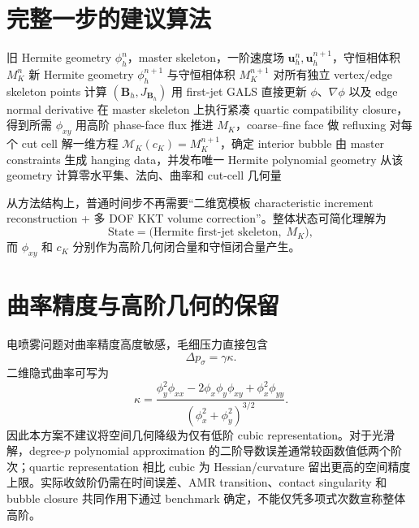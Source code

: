 \documentclass[11pt,a4paper]{ctexart}
\newcommand{\bu}{\bm{u}}
\newcommand{\bB}{\bm{B}}
\newcommand{\grad}{\nabla}
\begin{document}
\section{完整一步的建议算法}

\begin{algorithm}[H]
\caption{Conservative AMR Hermite--GALS one-step update}
\begin{algorithmic}[1]
\Require 旧 Hermite geometry $\phi_h^n$，master skeleton，一阶速度场 $\bu_h^n,\bu_h^{n+1}$，守恒相体积 $M_K^n$
\Ensure 新 Hermite geometry $\phi_h^{n+1}$ 与守恒相体积 $M_K^{n+1}$
\State 对所有独立 vertex/edge skeleton points 计算 $(\bB_h,J_{\bB_h})$
\State 用 first-jet GALS 直接更新 $\phi$、$\grad\phi$ 以及 edge normal derivative
\State 在 master skeleton 上执行紧凑 quartic compatibility closure，得到所需 $\phi_{xy}$
\State 用高阶 phase-face flux 推进 $M_K$，coarse--fine face 做 refluxing
\State 对每个 cut cell 解一维方程 $\mathcal M_K(c_K)=M_K^{n+1}$，确定 interior bubble
\State 由 master constraints 生成 hanging data，并发布唯一 Hermite polynomial geometry
\State 从该 geometry 计算零水平集、法向、曲率和 cut-cell 几何量
\end{algorithmic}
\end{algorithm}

从方法结构上，普通时间步不再需要“二维宽模板 characteristic increment reconstruction + 多 DOF KKT volume correction”。整体状态可简化理解为
\begin{equation}
    \boxed{
    \text{State}=
    \bigl(\text{Hermite first-jet skeleton},\;M_K\bigr),
    }
\end{equation}
而 $\phi_{xy}$ 和 $c_K$ 分别作为高阶几何闭合量和守恒闭合量产生。

\section{曲率精度与高阶几何的保留}

电喷雾问题对曲率精度高度敏感，毛细压力直接包含
\begin{equation}
    \Delta p_\sigma=\gamma\kappa.
\end{equation}
二维隐式曲率可写为
\begin{equation}
    \kappa=
    \frac{
    \phi_y^2\phi_{xx}
    -2\phi_x\phi_y\phi_{xy}
    +\phi_x^2\phi_{yy}
    }{
    (\phi_x^2+\phi_y^2)^{3/2}
    }.
    \label{eq:curvature}
\end{equation}
因此本方案不建议将空间几何降级为仅有低阶 cubic representation。对于光滑解，degree-$p$ polynomial approximation 的二阶导数误差通常较函数值低两个阶次；quartic representation 相比 cubic 为 Hessian/curvature 留出更高的空间精度上限。实际收敛阶仍需在时间误差、AMR transition、contact singularity 和 bubble closure 共同作用下通过 benchmark 确定，不能仅凭多项式次数宣称整体高阶。
\end{document}

